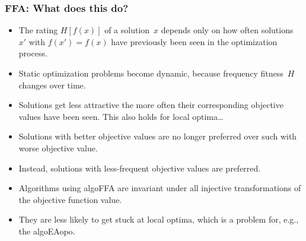 \documentclass[aspectratio=169,mathserif,notheorems]{beamer}%
\begin{document}
\begin{frame}%
\frametitle{FFA: What does this do?}%
\begin{itemize}%
\item The rating $H[f(x)]$ of a solution~$x$ depends only on how often solutions~$x'$ with $f(x')=f(x)$ have previously been seen in the optimization process.%
\item<2-> Static optimization problems become dynamic, because frequency fitness~$H$ changes over time.%
\item<3-> Solutions get less attractive the more often their corresponding objective values have been seen. This also holds for local optima\dots%
\item<4-> Solutions with better objective values are no longer preferred over such with worse objective value.%
\item<5-> Instead, solutions with less-frequent objective values are preferred.%
\item<6-> \alert{Algorithms using \gls{algoFFA} are invariant under all injective transformations of the objective function value.}%
\item<7-> They are less likely to get stuck at local optima, which is a problem for, e.g., the \gls{algoEAopo}.%
\end{itemize}%
\end{frame}%
%
\end{document}
